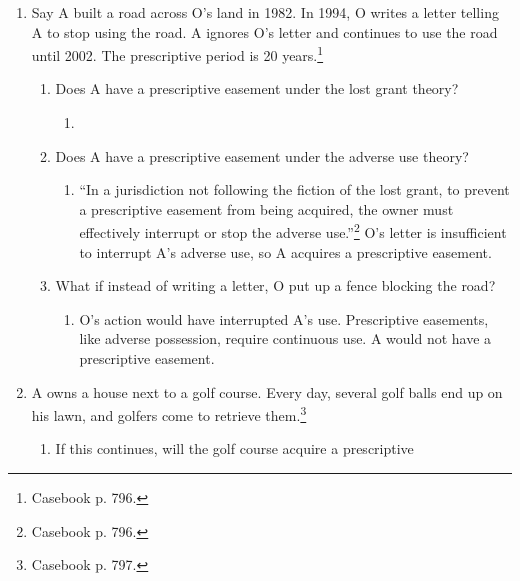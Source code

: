 \begin{enumerate}
    \item Say A built a road across O's land in 1982. In 1994, O writes a 
    letter telling A to stop using the road. A ignores O's letter and 
    continues to use the road until 2002. The prescriptive period is 20 
    years.\footnote{Casebook p. 796.}
    \begin{enumerate}
        \item Does A have a prescriptive easement under the lost grant theory?
        \begin{enumerate}
            \item %
        \end{enumerate}
        \item Does A have a prescriptive easement under the adverse use 
        theory?
        \begin{enumerate}
            \item ``In a jurisdiction not following the fiction of the lost 
            grant, to prevent a prescriptive easement from being acquired, the 
            owner must effectively interrupt or stop the adverse 
            use.''\footnote{Casebook p. 796.} O's letter is insufficient 
            to interrupt A's adverse use, so A acquires a prescriptive 
            easement.
        \end{enumerate}
        \item What if instead of writing a letter, O put up a fence blocking 
        the road?
        \begin{enumerate}
            \item O's action would have interrupted A's use. Prescriptive 
            easements, like adverse possession, require continuous use. A 
            would not have a prescriptive easement. 
        \end{enumerate}
    \end{enumerate}
    \item A owns a house next to a golf course. Every day, several golf balls 
    end up on his lawn, and golfers come to retrieve them.\footnote{Casebook 
    p. 797.}
    \begin{enumerate}
        \item If this continues, will the golf course acquire a prescriptive 

\end{enumerate}
\end{enumerate}
